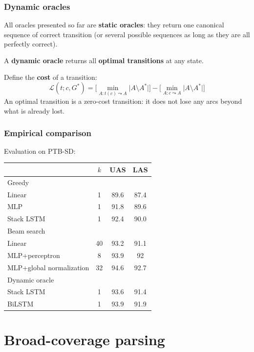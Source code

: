 \documentclass[t]{beamer}
\begin{document}
\begin{frame}
  \frametitle{Dynamic oracles \cite{goldberg2012dynamic}}
  All oracles presented so far are \textbf{static oracles}:
  they return one canonical sequence of correct transition
  (or several possible sequences as long as they are all perfectly correct).
  
  A \textbf{dynamic oracle} returns all \textbf{optimal transitions} at any state.
  
  \pause\vfill
  
  Define the \textbf{cost} of a transition:
  \[
  \mathcal{L}(t;c,G^*)=\Bigg[\min_{A:t(c)\leadsto A} \Big|A\setminus A^*\Big|\Bigg]-
  \Bigg[\min_{A:c\leadsto A} \Big|A\setminus A^*\Big|\Bigg]
  \]
  An optimal transition is a zero-cost transition:
  it does not lose any arcs beyond what is already lost.
\end{frame}

\begin{frame}
    \frametitle{Empirical comparison}
    Evaluation on PTB-SD:
    \begin{center}
    \begin{tabular}{l|c|cc}
    & $k$ & UAS & LAS \\ \hline
    Greedy \\
    Linear \cite{ZhangTDP11} & 1 & 89.6 & 87.4 \\
    MLP \cite{chen2014fast} & 1 & 91.8 & 89.6 \\
    Stack LSTM \cite{dyer2015transition} & 1 & 92.4 & 90.0 \\
    \hline
    Beam search \\
    Linear \cite{bohnet2012transition} & 40 & 93.2 & 91.1 \\
    MLP+perceptron \cite{weiss2015structured} & 8 & 93.9 & 92 \\
    MLP+global normalization \cite{andor2016globally} & 32 & 94.6 & 92.7 \\
    \hline
    Dynamic oracle \\
    Stack LSTM \cite{ballesteros-EtAl:2016:EMNLP2016} & 1 & 93.6 & 91.4 \\
    BiLSTM \cite{kiperwasser2016simple} & 1 & 93.9 & 91.9 \\
    \end{tabular}
    \end{center}
\end{frame}



\section{Broad-coverage parsing}
\end{document}
